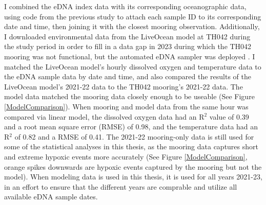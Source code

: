 \documentclass[12pt,twoside]{reedthesis}
\begin{document}
	I combined the eDNA index data with its corresponding oceanographic data, using code from the previous study to attach each sample ID to its corresponding date and time, then joining it with the closest mooring observation. Additionally, I downloaded environmental data from the LiveOcean model at TH042 during the study period in order to fill in a data gap in 2023 during which the TH042 mooring was not functional, but the automated eDNA sampler was deployed \autocite{Siedlecki2015a, Fatland2016, LiveOceanHomepage}. I matched the LiveOcean model's hourly dissolved oxygen and temperature data to the eDNA sample data by date and time, and also compared the results of the LiveOcean model's 2021-22 data to the TH042 mooring's 2021-22 data. The model data matched the mooring data closely enough to be useable (See Figure \ref{ModelComparison}). When mooring and model data from the same hour was compared via linear model, the dissolved oxygen data had an R$^2$ value of 0.39 and a root mean square error (RMSE) of 0.98, and the temperature data had an R$^2$ of 0.82 and a RMSE of 0.41. The 2021-22 mooring-only data is still used for some of the statistical analyses in this thesis, as the mooring data captures short and extreme hypoxic events more accurately (See Figure \ref{ModelComparison}, orange spikes downwards are hypoxic events captured by the mooring but not the model). When modeling data is used in this thesis, it is used for all years 2021-23, in an effort to ensure that the different years are comprable and utilize all available eDNA sample dates. 
	
\end{document}

